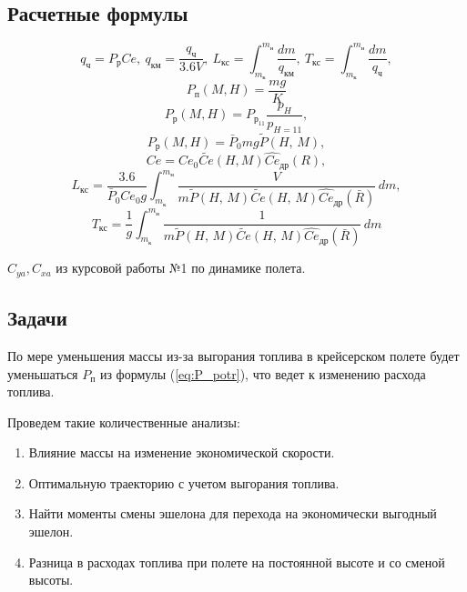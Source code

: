 \subsection{Расчетные формулы} 

\begin{equation}
\label{eq:L_T_integral}
q_{ч}=P_{р} Ce, \: q_{км}=\frac{q_{ч}}{3.6 V}, \: L_{кс}= \int_{m_к}^{m_н} \frac{dm}{q_{км}},\: T_{кс}= \int_{m_к}^{m_н} \frac{dm}{q_{ч}},
\end{equation}
\begin{equation}
    P_п(M, H)= \frac{mg}{K} 
    \label{eq:P_potr}
\end{equation}
\begin{equation}
    P_р(M, H)= P_{р_{11}} \frac{p_H}{p_{H=11}},
\end{equation}
\begin{equation}
    P_р(M, H) = \bar{P}_0 m g \tilde{P}(H,\, M),
\end{equation}
\begin{equation}
Ce = Ce_0 \tilde{Ce}(H,M) \hat{Ce}_{др}(R),
\end{equation}
\begin{equation}
    L_{кс}= \frac{3.6}{\bar{P}_0 Ce_0g} \int_{m_к}^{m_н} \frac{V}{m
    \tilde{P}(H,\,M) \tilde{Ce}(H,\, M) \hat{Ce}_{др}(\bar{R})}   \, dm,
\end{equation}
\begin{equation}
    T_{кс}= \frac{1}{g} \int_{m_к}^{m_н} \frac{1}{m \tilde{P}(H,\,M)
\tilde{Ce}(H,\, M) \hat{Ce}_{др}(\bar{R})}\, dm
\end{equation}

$C_{ya}, C_{xa}$ из курсовой работы №1 по динамике полета.

\subsection{Задачи}
По мере уменьшения массы из-за выгорания топлива в крейсерском полете будет уменьшаться $P_п$ из формулы (\ref{eq:P_potr}), что ведет к изменению расхода топлива.  

Проведем такие количественные анализы:  
\begin{enumerate}
    \item Влияние массы на изменение экономической скорости.
    \item Оптимальную траекторию с учетом выгорания топлива.
    \item Найти моменты смены эшелона для перехода на экономически выгодный эшелон. 
    \item Разница в расходах топлива при полете на постоянной высоте и со сменой высоты.
\end{enumerate}
